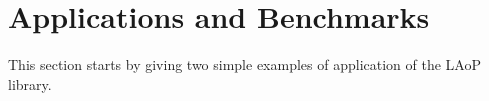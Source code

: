 \documentclass[sigplan,screen]{acmart}
\def\start{&&}
\def\more{\\&&}
\begin{document}
\section{Applications and Benchmarks}\label{sec-appl}
This section starts by giving two simple examples of application of the LAoP library.

%
%
%
%
\end{document}
